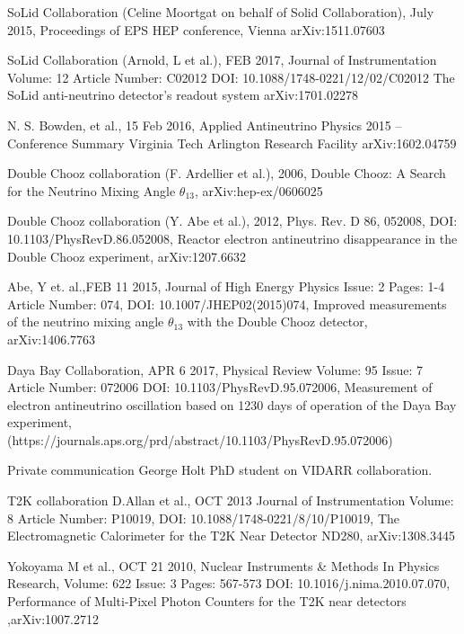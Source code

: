 \documentclass[12pt,a4paper]{article}
\begin{document}
\begin{thebibliography}{9}
SoLid Collaboration (Celine Moortgat on behalf of Solid Collaboration), July 2015, Proceedings of EPS HEP conference, Vienna arXiv:1511.07603

SoLid Collaboration (Arnold, L et al.), FEB 2017, Journal of Instrumentation Volume: 12 Article Number: C02012 DOI: 10.1088/1748-0221/12/02/C02012 The SoLid anti-neutrino detector's readout system arXiv:1701.02278

N. S. Bowden, et al., 15 Feb 2016, Applied Antineutrino Physics 2015 -- Conference Summary Virginia Tech Arlington Research Facility arXiv:1602.04759 

Double Chooz collaboration (F. Ardellier et al.), 2006, Double Chooz: A Search for the Neutrino Mixing Angle $\theta_{13}$, arXiv:hep-ex/0606025

Double Chooz collaboration (Y. Abe et al.), 2012, Phys. Rev. D 86, 052008, DOI: 10.1103/PhysRevD.86.052008, Reactor electron antineutrino disappearance in the Double Chooz experiment, arXiv:1207.6632

Abe, Y et. al.,FEB 11 2015, Journal of High Energy Physics Issue: 2  Pages: 1-4 Article Number: 074, DOI: 10.1007/JHEP02(2015)074, Improved measurements of the neutrino mixing angle $\theta_{13}$ with the Double Chooz detector, arXiv:1406.7763 

Daya Bay Collaboration, APR 6 2017, Physical Review Volume: 95  Issue: 7 Article Number: 072006 DOI: 10.1103/PhysRevD.95.072006, Measurement of electron antineutrino oscillation based on 1230 days of operation of the Daya Bay experiment, (https://journals.aps.org/prd/abstract/10.1103/PhysRevD.95.072006)

Private communication George Holt PhD student on VIDARR collaboration. 

T2K collaboration D.Allan et al., OCT 2013 Journal of Instrumentation Volume: 8 Article Number: P10019, DOI: 10.1088/1748-0221/8/10/P10019, The Electromagnetic Calorimeter for the T2K Near Detector ND280,	arXiv:1308.3445

Yokoyama M et al., OCT 21 2010, Nuclear Instruments \& Methods In Physics Research, Volume: 622  Issue: 3  Pages: 567-573 DOI: 10.1016/j.nima.2010.07.070, Performance of Multi-Pixel Photon Counters for the T2K near detectors ,arXiv:1007.2712


\end{thebibliography}
\end{document}
